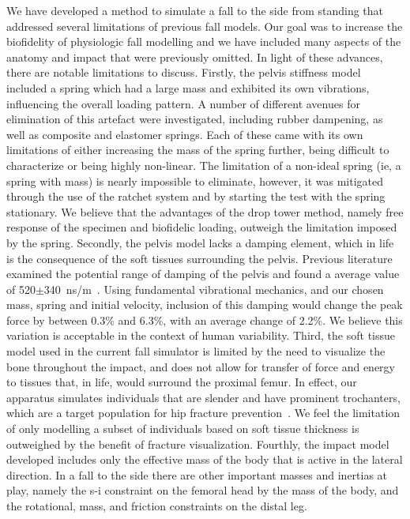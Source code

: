 We have developed a method to simulate a fall to the side from standing that addressed several limitations of previous fall models.
Our goal was to increase the biofidelity of physiologic fall modelling and we have included many aspects of the anatomy and impact that were previously omitted.
In light of these advances, there are notable limitations to discuss.
Firstly, the pelvis stiffness model included a spring which had a large mass and exhibited its own vibrations, influencing the overall loading pattern.
A number of different avenues for elimination of this artefact were investigated, including rubber dampening, as well as composite and elastomer springs.
Each of these came with its own limitations of either increasing the mass of the spring further, being difficult to characterize or being highly non-linear.
The limitation of a non-ideal spring (\ac{ie}, a spring with mass) is nearly impossible to eliminate, however, it was mitigated through the use of the ratchet system and by starting the test with the spring stationary.
We believe that the advantages of the drop tower method, namely free response of the specimen and biofidelic loading, outweigh the limitation imposed by the spring.
Secondly, the pelvis model lacks a damping element, which in life is the consequence of the soft tissues surrounding the pelvis.
Previous literature examined the potential range of damping of the pelvis and found a average value of 520$\pm$340~\ac{n}\ac{s}/\ac{m}~\citep{robinovitch_distribution_1997}.
Using fundamental vibrational mechanics, and our chosen mass, spring and initial velocity, inclusion of this damping would change the peak force by between 0.3\% and 6.3\%, with an average change of 2.2\%.
We believe this variation is acceptable in the context of human variability.
Third, the soft tissue model used in the current fall simulator is limited by the need to visualize the bone throughout the impact, and does not allow for transfer of force and energy to tissues that, in life, would surround the proximal femur.
In effect, our apparatus simulates individuals that are slender and have prominent trochanters, which are a target population for hip fracture prevention~\citep{nguyen_identification_2005}.
We feel the limitation of only modelling a subset of individuals based on soft tissue thickness is outweighed by the benefit of fracture visualization.
Fourthly, the impact model developed includes only the effective mass of the body that is active in the lateral direction.
In a fall to the side there are other important masses and inertias at play, namely the \ac{s-i} constraint on the femoral head by the mass of the body, and the rotational, mass, and friction constraints on the distal leg.
